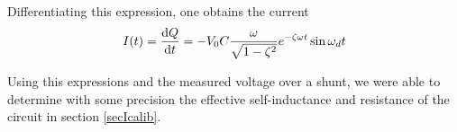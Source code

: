Differentiating this expression, one obtains the current
\begin{equation}
\label{current}
I(t) = \frac{\mathrm d Q}{\mathrm d t} = -V_0 C \frac{\omega}{\sqrt{1-\zeta^2}} e^{-\zeta \omega 
t} \sin{\omega_d t}
\end{equation}

Using this expressions and the measured voltage over a shunt, we were able to 
determine with some precision the effective self-inductance and resistance 
of the circuit in section \ref{secIcalib}.
